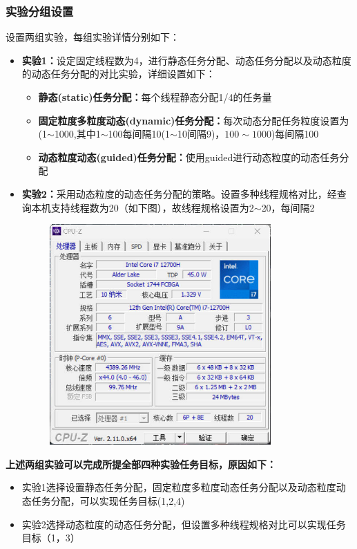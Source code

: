 \documentclass{nku}
\begin{document}
\subsubsection{实验分组设置}
设置两组实验，每组实验详情分别如下：
\begin{itemize}
    \item \textbf{实验1：}设定固定线程数为4，进行静态任务分配、动态任务分配以及动态粒度的动态任务分配的对比实验，详细设置如下：
    \begin{itemize}
        \item \textbf{静态(static)任务分配：}每个线程静态分配1/4的任务量
        \item \textbf{固定粒度多粒度动态(dynamic)任务分配：}每次动态分配任务粒度设置为(1$\sim$1000,其中1$\sim$100每间隔10(1$\sim$10间隔9)，$100\sim1000$)每间隔100
        \item \textbf{动态粒度动态(guided)任务分配：}使用guided进行动态粒度的动态任务分配
    \end{itemize}
    \item \textbf{实验2：}采用动态粒度的动态任务分配的策略。设置多种线程规格对比，经查询本机支持线程数为20（如下图），故线程规格设置为2$\sim$20，每间隔2
    \begin{figure}[H]
    \centering
    \includegraphics[width=0.8\textwidth]{fig/fig2}
    \end{figure}
\end{itemize}

\textbf{上述两组实验可以完成所提全部四种实验任务目标，原因如下：}
\begin{itemize}
    \item 实验1选择设置静态任务分配，固定粒度多粒度动态任务分配以及动态粒度动态任务分配，可以实现任务目标(1,2,4)
    \item 实验2选择动态粒度的动态任务分配，但设置多种线程规格对比可以实现任务目标（1，3）
\end{itemize}
\end{document}
